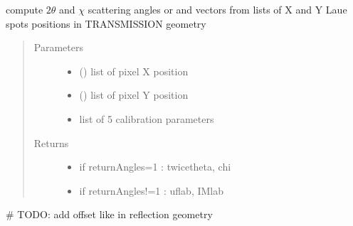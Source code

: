 \documentclass[letterpaper,10pt,english]{sphinxmanual}
\begin{document}

\begin{fulllineitems}
\label{\detokenize{Simulation_Module:LaueTools.LaueGeometry.calc_uflab_trans}}
compute \(2 \theta\) and \(\chi\) scattering angles or  and  vectors
from lists of X and Y Laue spots positions
in TRANSMISSION geometry
\begin{quote}\begin{description}
\item[{Parameters}] \leavevmode\begin{itemize}
\item {} 
 () \textendash{} list of pixel X position

\item {} 
 () \textendash{} list of pixel Y position

\item {} 
 \textendash{} list of 5 calibration parameters

\end{itemize}

\item[{Returns}] \leavevmode
\begin{itemize}
\item {} 
if returnAngles=1   : twicetheta, chi   

\item {} 
if returnAngles!=1  : uflab, IMlab

\end{itemize}


\end{description}\end{quote}

\# TODO: add offset like in reflection geometry

\end{fulllineitems}

\end{document}
